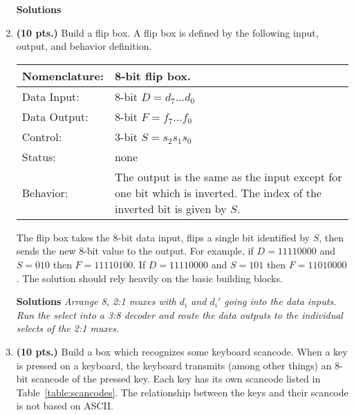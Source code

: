 \begin{enumerate}
\begin{onlysolution} \textbf{Solutions} \itshape {
\begin{figure}[ht]
\end{figure}
} \end{onlysolution} 
                                                                                
\item \textbf{ (10 pts.)}
\label{page:flipbox}
Build a flip box.  A flip box is defined by the following input,
output, and behavior definition.

\begin{tabular}{|l|p{3.5in}|} \hline
Nomenclature:  & 8-bit flip box.                    \\ \hline
Data Input:    & 8-bit $D=d_7 \ldots d_0$          \\ \hline
Data Output:   & 8-bit $F=f_7 \ldots f_0$          \\ \hline
Control:       & 3-bit $S=s_2 s_1 s_0$            \\ \hline
Status:        & none                                   \\ \hline
Behavior:      & The output is the same as the input except for
		one bit which is inverted.  The index of the inverted
		bit is given by $S$. \\ \hline
\end{tabular}

The flip box takes the 8-bit data input, flips a single bit identified
by $S$, then sends the new 8-bit value to the output.  
For example, if $D=11110000$ and $S=010$ then
$F=11110100$.  If $D=11110000$ and $S=101$ then $F=11010000$.  The solution
should rely heavily on the basic building blocks.

\begin{onlysolution} \textbf{Solutions} \itshape {
Arrange 8, 2:1 muxes with $d_i$ and $d_i'$ going into the data inputs.
Run the select into a 3:8 decoder and route the data outputs to the 
individual selects of the 2:1 muxes.
} \end{onlysolution} 


\item \textbf{ (10 pts.)}
\label{page:IsScan}
Build a box which recognizes some keyboard scancode.  When a key is 
pressed on a keyboard, the keyboard transmits (among other things) 
an 8-bit scancode of the pressed key.  Each key has its own scancode 
listed in Table~\ref{table:scancodes}.  The relationship between the 
keys and their scancode is not based on ASCII.


\end{enumerate}
